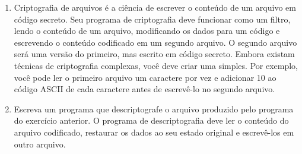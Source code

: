 \documentclass[12pt]{article}
\begin{document}
\begin{enumerate}
  \item Criptografia de arquivos é a ciência de escrever o conteúdo de um arquivo em código secreto. Seu programa de criptografia deve funcionar como um filtro, lendo o conteúdo de um arquivo, modificando os dados para um código e escrevendo o conteúdo codificado em um segundo arquivo. O segundo arquivo será uma versão do primeiro, mas escrito em código secreto. Embora existam técnicas de criptografia complexas, você deve criar uma simples. Por exemplo, você pode ler o primeiro arquivo um caractere por vez e adicionar 10 ao código ASCII de cada caractere antes de escrevê-lo no segundo arquivo.

  \item Escreva um programa que descriptografe o arquivo produzido pelo programa do exercício anterior. O programa de descriptografia deve ler o conteúdo do arquivo codificado, restaurar os dados ao seu estado original e escrevê-los em outro arquivo.
  
\end{enumerate}
\end{document}
